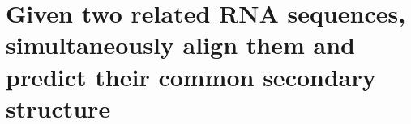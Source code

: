 \chapter{Given two related RNA sequences, simultaneously align them and predict their common secondary structure}
